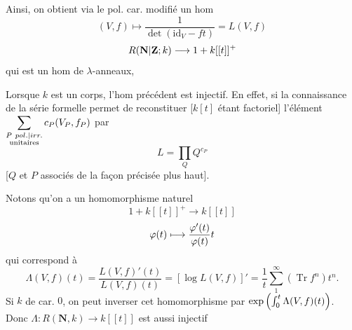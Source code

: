 Ainsi, on obtient via le pol. car. modifié un
hom
\[
(V,f)\longmapsto\frac1{\det(\mathrm{id}_V-ft)}=L(V,f)
\]
\[
R(\mathbf N|\mathbf Z;k)\longrightarrow 1+k[[t]]^+
\]
qui est un hom de $\lambda$-anneaux,

Lorsque $k$ est un corps, l'hom
précédent est injectif. En effet, si
 la connaissance de la
série formelle permet de reconstituer 
[$k[t]$
étant factoriel] l'élément
$\displaystyle\sum_{\substack{P\ \unsure{pol.|irr.}\\\mathrm{unitaires}}}c_P(V_P,f_P)$
 par
\[
L=\prod_Q Q^{c_P}
\]
[$Q$ et $P$ associés de
la façon précisée plus haut].

Notons qu'on a un homomorphisme
naturel 
\[
1+k[[t]]^+\longrightarrow k[[t]]
\]
\[
\varphi(t)\longmapsto\frac{\varphi'(t)}{\varphi(t)}t
\]
qui correspond à
\[
\Lambda(V,f)(t)=\frac{L(V,f)'(t)}{L(V,f)(t)}
=[\log L(V,f)]'=\frac1t\sum_1^\infty(\operatorname{Tr}f^n)t^n.
\]
Si $k$ de car. $0$,  on peut inverser cet
homomorphisme par $\exp\left(\int_0^{t}\Lambda(V,f)(t)\right)$.
Donc 
$\Lambda:R(\mathbf N,k)\longrightarrow k[[t]]$ est aussi injectif 
